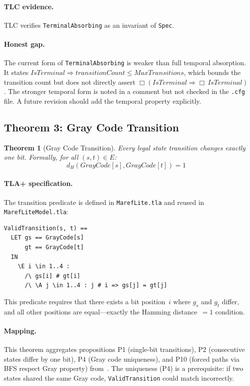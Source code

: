 \documentclass[11pt]{article}
\newtheorem{theorem}{Theorem}
\begin{document}
\paragraph{TLC evidence.} TLC verifies \texttt{TerminalAbsorbing} as an
invariant of \texttt{Spec}.

\paragraph{Honest gap.} The current form of \texttt{TerminalAbsorbing} is
weaker than full temporal absorption. It states
$\mathit{IsTerminal} \Rightarrow \mathit{transitionCount} \leq \mathit{MaxTransitions}$,
which bounds the transition count but does not directly assert
$\Box(\mathit{IsTerminal} \Rightarrow \Box\,\mathit{IsTerminal})$. The stronger
temporal form is noted in a comment but not checked in the \texttt{.cfg} file.
A future revision should add the temporal property explicitly.

\subsection{Theorem 3: Gray Code Transition}

\begin{theorem}[Gray Code Transition]
Every legal state transition changes exactly one bit. Formally, for all
$(s, t) \in E$:
\[
d_H(\mathit{GrayCode}[s], \mathit{GrayCode}[t]) = 1
\]
\end{theorem}

\paragraph{TLA+ specification.} The transition predicate is defined in
\texttt{MarefLite.tla} and reused in \texttt{MarefLiteModel.tla}:

\begin{lstlisting}
ValidTransition(s, t) ==
  LET gs == GrayCode[s]
      gt == GrayCode[t]
  IN
    \E i \in 1..4 :
      /\ gs[i] # gt[i]
      /\ \A j \in 1..4 : j # i => gs[j] = gt[j]
\end{lstlisting}

This predicate requires that there exists a bit position~$i$ where $g_s$ and
$g_t$ differ, and all other positions are equal---exactly the Hamming
distance~$=1$ condition.

\paragraph{Mapping.} This theorem aggregates propositions P1 (single-bit
transitions), P2 (consecutive states differ by one bit), P4 (Gray code
uniqueness), and P10 (forced paths via BFS respect Gray property)
from~\cite{maref-w3}. The uniqueness (P4) is a prerequisite: if two states
shared the same Gray code, \texttt{ValidTransition} could match incorrectly.
\end{document}
